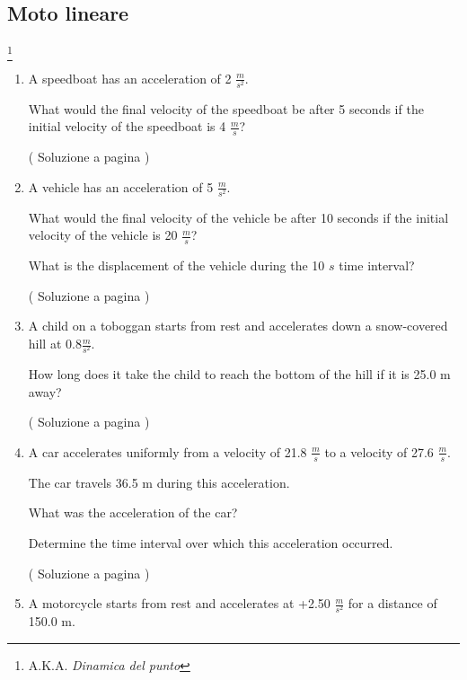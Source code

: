 \subsection{Moto lineare} \label{sec:motolineare}
\footnote {A.K.A. \em{Dinamica del punto}}

\setcounter{equation}{0}
\begin{enumerate}

\item A speedboat has an acceleration of 2 $\frac{m}{s^2}$.  \label{ex_f_1} 

What would the final velocity of the speedboat be after 5 seconds if the initial velocity of the speedboat is 4 $\frac{m}{s}$?

( Soluzione a pagina \pageref{sol_f_1} )

\item A vehicle has an acceleration of 5 $\frac{m}{s^2}$. \label{ex_f_2} 

What would the final velocity of the vehicle be after 10 seconds if the initial velocity of the vehicle is 20 $\frac{m}{s}$?

What is the displacement of the vehicle during the 10 $s$ time interval?

( Soluzione a pagina \pageref{sol_f_2} )








\item A child on a toboggan starts from rest and accelerates down a snow-covered hill at 0.8$\frac{m}{s^2}$.  \label{ex_f_3} 

How long does it take the child to reach the bottom of the hill if it is 25.0 m away?

( Soluzione a pagina \pageref{sol_f_3} )







\item  A car accelerates uniformly from a velocity of 21.8 $\frac{m}{s}$ to a velocity of 27.6 $\frac{m}{s}$. \label{ex_f_4} 

The car travels 36.5 m during this acceleration.


What was the acceleration of the car?


Determine the time interval over which this acceleration occurred.


( Soluzione a pagina \pageref{sol_f_4} )


\item A motorcycle starts from rest and accelerates at +2.50 $\frac{m}{s^2}$ for a distance of 150.0 m. \label{ex_f_5} 




\end{enumerate}
